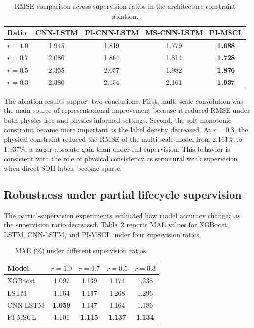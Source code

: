 \documentclass[a4paper,fleqn]{cas-dc}
\begin{document}
\begin{table}[t]
\caption{RMSE comparison across supervision ratios in the architecture-constraint ablation.}
\label{tab:ablation_ratios}
\centering
\begin{tabular}{lcccc}
\toprule
Ratio & CNN-LSTM & PI-CNN-LSTM & MS-CNN-LSTM & PI-MSCL \\
\midrule
$r=1.0$ & 1.945 & 1.819 & 1.779 & \textbf{1.688} \\
$r=0.7$ & 2.086 & 1.864 & 1.814 & \textbf{1.728} \\
$r=0.5$ & 2.355 & 2.057 & 1.982 & \textbf{1.876} \\
$r=0.3$ & 2.380 & 2.154 & 2.161 & \textbf{1.937} \\
\bottomrule
\end{tabular}
\end{table}

The ablation results support two conclusions. First, multi-scale convolution was the main source of representational improvement because it reduced RMSE under both physics-free and physics-informed settings. Second, the soft monotonic constraint became more important as the label density decreased. At $r=0.3$, the physical constraint reduced the RMSE of the multi-scale model from 2.161\% to 1.937\%, a larger absolute gain than under full supervision. This behavior is consistent with the role of physical consistency as structural weak supervision when direct SOH labels become sparse.

\subsection{Robustness under partial lifecycle supervision}
\label{subsec:partial_results}

The partial-supervision experiments evaluated how model accuracy changed as the supervision ratio decreased. Table~\ref{tab:mae_ratios} reports MAE values for XGBoost, LSTM, CNN-LSTM, and PI-MSCL under four supervision ratios.

\begin{table}[t]
\caption{MAE (\%) under different supervision ratios.}
\label{tab:mae_ratios}
\centering
\begin{tabular}{lcccc}
\toprule
Model & $r=1.0$ & $r=0.7$ & $r=0.5$ & $r=0.3$ \\
\midrule
XGBoost & 1.097 & 1.139 & 1.174 & 1.238 \\
LSTM & 1.164 & 1.197 & 1.268 & 1.296 \\
CNN-LSTM & \textbf{1.059} & 1.147 & 1.164 & 1.186 \\
PI-MSCL & 1.101 & \textbf{1.115} & \textbf{1.137} & \textbf{1.134} \\
\bottomrule
\end{tabular}
\end{table}
\end{document}
